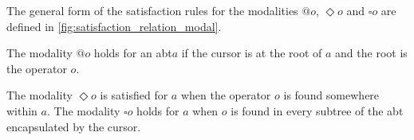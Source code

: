 \documentclass[sigplan]{acmart}
\newcommand{\abt}{\textsf{abt}\xspace}
\begin{document}

The general form of the satisfaction rules for the modalities $@o$,
$\Diamond o$ and $\square o$ are defined in
\cref{fig:satisfaction_relation_modal}.

The modality $@o$ holds for an \abt $a$ if the cursor is at the root of
$a$ and the root is the operator $o$.

The modality $\Diamond o$ is satisfied for $a$ when the operator $o$ is
found somewhere within $a$. The modality
$\square o$ holds for $a$ when $o$ is found in every subtree of the
\abt encapsulated by the cursor. 
\end{document}
